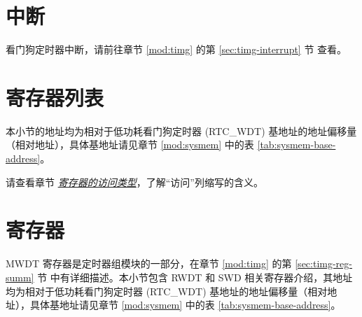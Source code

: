 \documentclass[main\_\_CN.tex]{subfiles}
\begin{document}
\section{中断}

看门狗定时器中断，请前往章节 \ref{mod:timg} \textit{} 的第 \ref{sec:timg-interrupt} 节 \textit{} 查看。



\clearpage
\hypertarget{wdt-reg-summ}{}
\section{寄存器列表}
\label{sec:wdt-reg-summ}


本小节的地址均为相对于低功耗看门狗定时器 (RTC\_WDT) 基地址的地址偏移量（相对地址），具体基地址请见章节 \ref{mod:sysmem} \textit{} 中的表 \ref{tab:sysmem-base-address}。

请查看章节 \hyperref[glossary-access-types]{\textit{寄存器的访问类型}}，了解“访问”列缩写的含义。






\section{寄存器}

MWDT 寄存器是定时器组模块的一部分，在章节 \ref{mod:timg} \textit{} 的第 \ref{sec:timg-reg-summ} 节 \textit{} 中有详细描述。本小节包含 RWDT 和 SWD 相关寄存器介绍，其地址均为相对于低功耗看门狗定时器 (RTC\_WDT) 基地址的地址偏移量（相对地址），具体基地址请见章节 \ref{mod:sysmem} \textit{} 中的表 \ref{tab:sysmem-base-address}。


\end{document}
